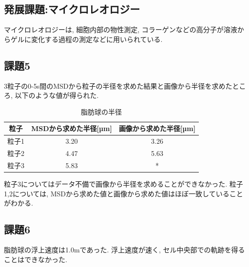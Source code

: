 \documentclass[11pt]{ltjsarticle}
\begin{document}
    \subsection*{発展課題:マイクロレオロジー}
      マイクロレオロジーは, 細胞内部の物性測定, コラーゲンなどの高分子が溶液からゲルに変化する過程の測定などに用いられている.
    \subsection*{課題5}
      3粒子の0-5s間のMSDから粒子の半径を求めた結果と画像から半径を求めたところ,  以下のような値が得られた.\\
      \begin{table}[H]
        \centering
        \begin{tabular}{|c|c|c|}\hline
          粒子 & MSDから求めた半径[µm] & 画像から求めた半径[µm] \\
          \hline
          粒子1 & 3.20 & 3.26 \\\hline
          粒子2 & 4.47 & 5.63\\\hline
          粒子3 & 5.83 & * \\\hline
        \end{tabular}
        \caption{脂肪球の半径}
        \label{tab:ps_radius}
      \end{table}
      粒子3についてはデータ不備で画像から半径を求めることができなかった.
      粒子1,2については, MSDから求めた値と画像から求めた値はほぼ一致していることがわかる.\\
    \subsection*{課題6}
      脂肪球の浮上速度は1.0\mu mであった. 浮上速度が速く, セル中央部での軌跡を得ることはできなかった. 
\end{document}
